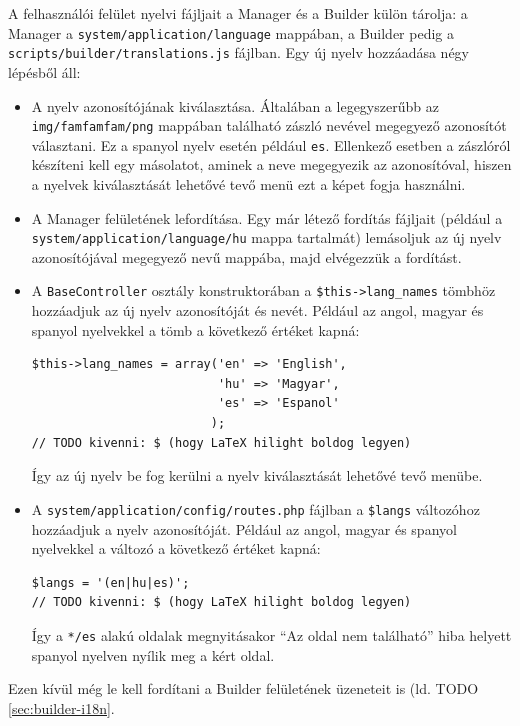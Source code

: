 \documentclass[12pt,a4paper,twoside]{article}
\begin{document}
A felhasználói felület nyelvi fájljait a Manager és a Builder külön tárolja: a
Manager a \texttt{system/application/language} mappában, a Builder pedig a
\texttt{scripts/builder/translations.js} fájlban. Egy új nyelv hozzáadása négy
lépésből áll:

\begin{itemize}
  \item A nyelv azonosítójának kiválasztása. Általában a legegyszerűbb az
    \texttt{img/famfamfam/png} mappában található zászló nevével megegyező
    azonosítót választani. Ez a spanyol nyelv esetén például
    \texttt{es}. Ellenkező esetben a zászlóról készíteni kell egy
    másolatot, aminek a neve megegyezik az azonosítóval, hiszen a nyelvek
    kiválasztását lehetővé tevő menü ezt a képet fogja használni.
  \item A Manager felületének lefordítása. Egy már létező fordítás fájljait
    (például a \texttt{system/application/language/hu} mappa tartalmát)
    lemásoljuk az új nyelv azonosítójával megegyező nevű mappába, majd
    elvégezzük a fordítást.
  \item A \texttt{BaseController} osztály konstruktorában a
    \texttt{\$this->lang\_names} tömbhöz hozzáadjuk az új nyelv azonosítóját és
    nevét. Például az angol, magyar és spanyol nyelvekkel a tömb a következő
    értéket kapná:
    \begin{lstlisting}[firstnumber=35]
$this->lang_names = array('en' => 'English',
                          'hu' => 'Magyar',
                          'es' => 'Espanol'
                         );
// TODO kivenni: $ (hogy LaTeX hilight boldog legyen)
    \end{lstlisting}
    Így az új nyelv be fog kerülni a nyelv kiválasztását lehetővé tevő menübe.
  \item A \texttt{system/application/config/routes.php} fájlban a
    \texttt{\$langs} változóhoz hozzáadjuk a nyelv azonosítóját. Például az
    angol, magyar és spanyol nyelvekkel a változó a következő értéket kapná:
    \begin{lstlisting}[firstnumber=46]
$langs = '(en|hu|es)';
// TODO kivenni: $ (hogy LaTeX hilight boldog legyen)
    \end{lstlisting}
    Így a \texttt{*/es} alakú oldalak megnyitásakor ``Az oldal nem található''
    hiba helyett spanyol nyelven nyílik meg a kért oldal.

\end{itemize}

Ezen kívül még le kell fordítani a Builder felületének üzeneteit is (ld. TODO
\ref{sec:builder-i18n}.
\end{document}
